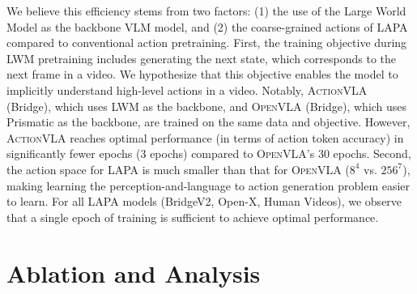 \documentclass{article} %
\begin{document}
We believe this efficiency stems from two factors: (1) the use of the Large World Model \citep{liu2024worldmodelmillionlengthvideo} as the backbone VLM model, and (2) the coarse-grained actions of LAPA compared to conventional action pretraining. First, the training objective during LWM pretraining includes generating the next state, which corresponds to the next frame in a video. We hypothesize that this objective enables the model to implicitly understand high-level actions in a video. Notably, \textsc{ActionVLA} (Bridge), which uses LWM as the backbone, and \textsc{OpenVLA} (Bridge), which uses Prismatic as the backbone, are trained on the same data and objective. However, \textsc{ActionVLA} reaches optimal performance (in terms of action token accuracy) in significantly fewer epochs (3 epochs) compared to \textsc{OpenVLA}'s 30 epochs. Second, the action space for LAPA is much smaller than that for \textsc{OpenVLA} ($8^4$ vs. $256^7$), making learning the perception-and-language to action generation problem easier to learn. For all LAPA models (BridgeV2, Open-X, Human Videos), we observe that a single epoch of training is sufficient to achieve optimal performance.

\section{Ablation and Analysis}
\label{sec:ablation}
\end{document}
